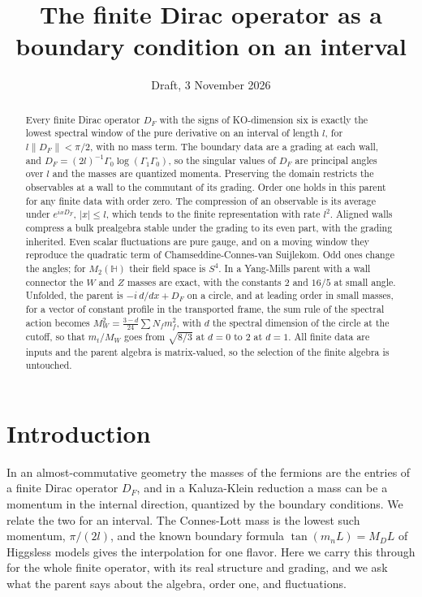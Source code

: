 \documentclass[aps,prd,reprint,onecolumn,nofootinbib,amsmath,amssymb,floatfix]{revtex4-2}
\theoremstyle{plain}
\renewcommand{\H}{\mathbb H}
\begin{document}
\title{The finite Dirac operator as a boundary condition on an interval}
\date{Draft, 3 November 2026}

\begin{abstract}
Every finite Dirac operator $D_F$ with the signs of KO-dimension six is exactly the lowest spectral window of the pure derivative on an interval of length $l$, for $l\|D_F\|<\pi/2$, with no mass term. The boundary data are a grading at each wall, and $D_F=(2l)^{-1}\Gamma_0\log(\Gamma_1\Gamma_0)$, so the singular values of $D_F$ are principal angles over $l$ and the masses are quantized momenta. Preserving the domain restricts the observables at a wall to the commutant of its grading. Order one holds in this parent for any finite data with order zero. The compression of an observable is its average under $e^{ixD_F}$, $|x|\le l$, which tends to the finite representation with rate $l^2$. Aligned walls compress a bulk prealgebra stable under the grading to its even part, with the grading inherited. Even scalar fluctuations are pure gauge, and on a moving window they reproduce the quadratic term of Chamseddine-Connes-van Suijlekom. Odd ones change the angles; for $M_2(\H)$ their field space is $S^4$. In a Yang-Mills parent with a wall connector the $W$ and $Z$ masses are exact, with the constants $2$ and $16/5$ at small angle. Unfolded, the parent is $-i\,d/dx+D_F$ on a circle, and at leading order in small masses, for a vector of constant profile in the transported frame, the sum rule of the spectral action becomes $M_W^2=\frac{3-d}{24}\sum N_fm_f^2$, with $d$ the spectral dimension of the circle at the cutoff, so that $m_t/M_W$ goes from $\sqrt{8/3}$ at $d=0$ to $2$ at $d=1$. All finite data are inputs and the parent algebra is matrix-valued, so the selection of the finite algebra is untouched.
\end{abstract}

\maketitle

\section{Introduction}

In an almost-commutative geometry the masses of the fermions are the entries of a finite Dirac operator $D_F$, and in a Kaluza-Klein reduction a mass can be a momentum in the internal direction, quantized by the boundary conditions. We relate the two for an interval. The Connes-Lott mass is the lowest such momentum, $\pi/(2l)$, and the known boundary formula $\tan(m_nL)=M_DL$ of Higgsless models \cite{Csaki2004} gives the interpolation for one flavor. Here we carry this through for the whole finite operator, with its real structure and grading, and we ask what the parent says about the algebra, order one, and fluctuations.
\end{document}
